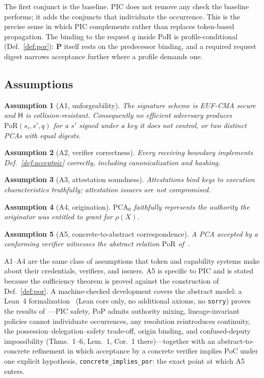 \documentclass[conference]{IEEEtran}
\newcommand{\PoR}{\mathrm{PoR}}
\newcommand{\PoC}{\mathrm{PoC}}
\newcommand{\Hsh}{\mathsf{H}}
\newtheorem{assumption}{Assumption}
\begin{document}
The first conjunct is the baseline. PIC does not remove any check the baseline performs; it adds the conjuncts that individuate the occurrence. This is the precise sense in which PIC complements rather than replaces token-based propagation. The binding to the request $q$ inside $\PoR$ is profile-conditional (Def.~\ref{def:por}): $\mathbf{P}$ itself rests on the predecessor binding, and a required request digest narrows acceptance further where a profile demands one.

\subsection{Assumptions}
\begin{assumption}[A1, unforgeability]
The signature scheme is EUF-CMA secure and $\Hsh$ is collision-resistant. Consequently no efficient adversary produces $\PoR(s_i,s',q)$ for a $s'$ signed under a key it does not control, or two distinct PCAs with equal digests.
\end{assumption}
\begin{assumption}[A2, verifier correctness]
Every receiving boundary implements Def.~\ref{def:acceptpic} correctly, including canonicalization and hashing.
\end{assumption}
\begin{assumption}[A3, attestation soundness]
Attestations bind keys to execution characteristics truthfully; attestation issuers are not compromised.
\end{assumption}
\begin{assumption}[A4, origination]
$\mathrm{PCA}_0$ faithfully represents the authority the originator was entitled to grant for $\rho(X)$.
\end{assumption}
\begin{assumption}[A5, concrete-to-abstract correspondence]
A PCA accepted by a conforming verifier witnesses the abstract relation $\PoR$ of~\cite{gallo2026poc}.
\end{assumption}

A1--A4 are the same class of assumptions that token and capability systems make about their credentials, verifiers, and issuers. A5 is specific to PIC and is stated because the sufficiency theorem is proved against the construction of Def.~\ref{def:por}. A machine-checked development covers the abstract model: a Lean~4 formalization~\cite{picmodellean} (Lean core only, no additional axioms, no \texttt{sorry}) proves the results of~\cite{gallo2026poc}---PIC safety, PoP admits authority mixing, lineage-invariant policies cannot individuate occurrences, any resolution reintroduces continuity, the possession--delegation--safety trade-off, origin binding, and confused-deputy impossibility (Thms.~1--6, Lem.~1, Cor.~1 there)---together with an abstract-to-concrete refinement in which acceptance by a concrete verifier implies $\PoC$ under one explicit hypothesis, \texttt{concrete\_implies\_por}: the exact point at which A5 enters.
\end{document}
